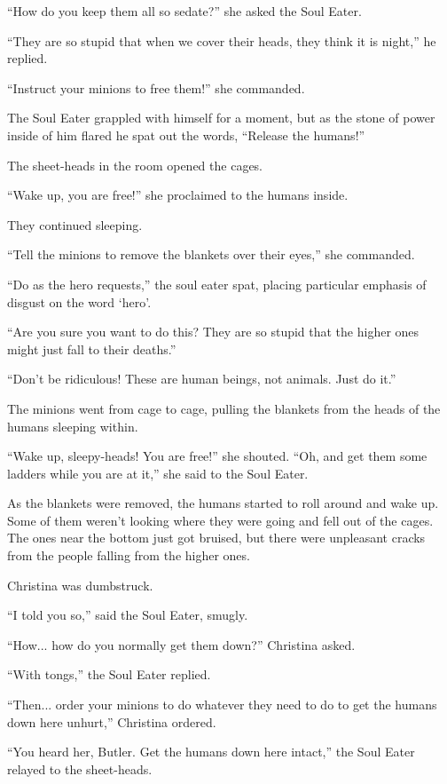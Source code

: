 \documentclass[showtrims,b6paper,draft,10pt]{memoir}
\begin{document}
``How do you keep them all so sedate?''  she asked the Soul Eater.

``They are so stupid that when we cover their heads, they think it is night,'' he replied.

``Instruct your minions to free them!''  she commanded.

The Soul Eater grappled with himself for a moment, but as the stone of power inside of him flared he spat out the words, ``Release the humans!''

The sheet-heads in the room opened the cages.

``Wake up, you are free!'' she proclaimed to the humans inside.

They continued sleeping.

``Tell the minions to remove the blankets over their eyes,''  she commanded.

``Do as the hero requests,'' the soul eater spat, placing particular emphasis of disgust on the word `hero'.

``Are you sure you want to do this?  They are so stupid that the higher ones might just fall to their deaths.''

``Don't be ridiculous!  These are human beings, not animals.  Just do it.''

The minions went from cage to cage, pulling the blankets from the heads of the humans sleeping within.

``Wake up, sleepy-heads!  You are free!'' she shouted.  ``Oh, and get them some ladders while you are at it,'' she said to the Soul Eater.

As the blankets were removed, the humans started to roll around and wake up.  Some of them weren't looking where they were going and fell out of the cages.  The ones near the bottom just got bruised, but there were unpleasant cracks from the people falling from the higher ones.

Christina was dumbstruck.

``I told you so,'' said the Soul Eater, smugly.

``How... how do you normally get them down?'' Christina asked.

``With tongs,'' the Soul Eater replied.

``Then... order your minions to do whatever they need to do to get the humans down here unhurt,'' Christina ordered.

``You heard her, Butler.  Get the humans down here intact,'' the Soul Eater relayed to the sheet-heads.
\end{document}
